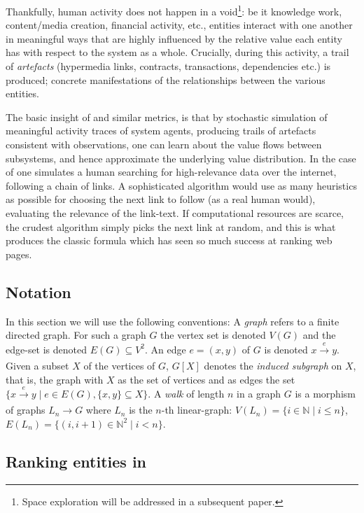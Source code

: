 Thankfully, human activity does not happen in a void\footnote{Space
  exploration will be addressed in a subsequent paper.}: be it
knowledge work, content/media creation, financial activity, etc.,
entities interact with one another in meaningful ways that are highly
influenced by the relative value each entity has with respect to the
system as a whole. Crucially, during this activity, a trail of
\emph{artefacts} (hypermedia links, contracts, transactions,
dependencies etc.) is produced; concrete manifestations
of the relationships between the various entities.


The basic insight of \pagerank{} and similar metrics, is that by
stochastic simulation of meaningful activity traces of system agents,
producing trails of artefacts consistent with observations, one can
learn about the value flows between subsystems, and hence approximate
the underlying value distribution. In the case of \pagerank{} one
simulates a human searching for high-relevance data over the internet,
following a chain of links. A sophisticated algorithm would use as
many heuristics as possible for choosing the next link to follow (as a
real human would), \eg{} evaluating the relevance of the link-text. If
computational resources are scarce, the crudest algorithm simply picks
the next link at random, and this is what produces the classic
\pagerank{} formula which has seen so much success at ranking web
pages.

\subsection{Notation}

In this section we will use the following conventions: A \emph{graph} refers to
a finite directed graph. For such a graph $G$ the vertex set is denoted $V(G)$
and the edge-set is denoted $E(G) \subseteq V^2$. An edge $e = (x,y)$ of $G$ is
denoted $x \xrightarrow[]{e} y$. Given a subset $X$ of the vertices of $G$,
$G[X]$ denotes the \emph{induced subgraph} on $X$, that is, the graph with $X$
as the set of vertices and as edges the set
$\{ x \xrightarrow[]{e} y \mid e \in E(G), \{x,y\} \subseteq X\}$. A \emph{walk}
of length $n$ in a graph $G$ is a morphism of graphs $L_n \to G$ where $L_n$ is
the $n$-th linear-graph: $V(L_n) = \{i \in \mathbb{N} \mid i \leq n \}$,
$E(L_n) = \{ (i,i+1) \in \mathbb{N}^2 \mid i < n \}$.

\subsection{Ranking entities in \oscoin{}}
\label{s:netgraph}

